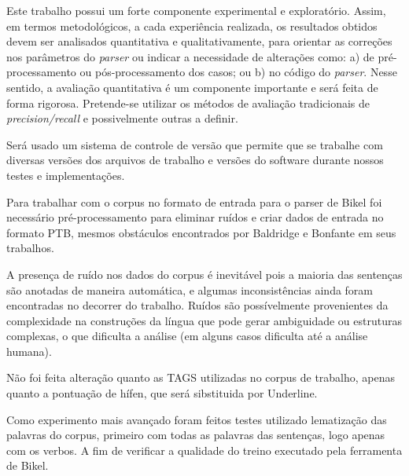 Este trabalho possui um forte componente experimental e exploratório. Assim, em termos metodológicos, a cada experiência realizada, os resultados obtidos devem ser analisados quantitativa e qualitativamente, para orientar as correções nos parâmetros do \emph{parser} ou indicar a necessidade de alterações como: a) de pré-processamento ou pós-processamento dos casos; ou b) no código do \emph{parser}. Nesse sentido, a avaliação quantitativa é um componente importante e será feita de forma rigorosa. Pretende-se utilizar os métodos de avaliação tradicionais de \emph{precision/recall} \cite{black93} e possivelmente outras a definir.

Será usado um sistema de controle de versão que permite que se trabalhe com diversas versões dos arquivos de trabalho
e  versões do software durante nossos testes e implementações.

Para trabalhar com o corpus no formato de entrada para o parser de Bikel foi necessário pré-processamento para eliminar ruídos e criar dados de entrada no formato PTB, mesmos obstáculos encontrados por Baldridge \cite{baldridge06} e Bonfante\cite{bonfante03} em seus trabalhos. 

A presença de ruído nos dados do corpus é inevitável pois a maioria das sentenças são anotadas de maneira automática, e algumas inconsistências ainda foram encontradas no decorrer do trabalho. Ruídos são possívelmente provenientes da complexidade na construções da língua que pode gerar ambiguidade ou estruturas complexas, o que dificulta a análise (em alguns casos dificulta até a análise humana). %



Não foi feita alteração quanto as TAGS utilizadas no corpus de trabalho, apenas quanto a pontuação de hífen, que será sibstituida por Underline.

Como experimento mais avançado foram feitos testes utilizado lematização das palavras do corpus, primeiro com todas as palavras das sentenças, logo apenas com os verbos. A fim de verificar a qualidade do treino executado pela ferramenta de Bikel.

